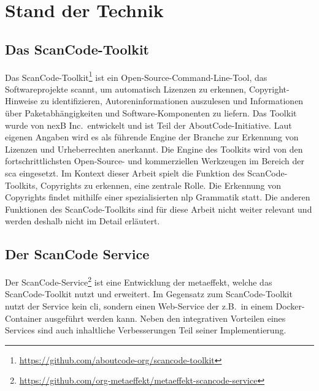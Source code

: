\chapter{Stand der Technik}\label{ch:stand-der-technik}



\section{Das ScanCode-Toolkit}\label{sec:scancode-toolkit}

Das ScanCode-Toolkit\footnote{\url{https://github.com/aboutcode-org/scancode-toolkit}} ist ein Open-Source-Command-Line-Tool, das Softwareprojekte scannt, um automatisch Lizenzen zu erkennen, Copyright-Hinweise zu identifizieren, Autoreninformationen auszulesen und Informationen über Paketabhängigkeiten und Software-Komponenten zu liefern.
Das Toolkit wurde von nexB Inc.\ entwickelt und ist Teil der AboutCode-Initiative.
Laut eigenen Angaben wird es als führende Engine der Branche zur Erkennung von Lizenzen und Urheberrechten anerkannt.
Die Engine des Toolkits wird von den fortschrittlichsten Open-Source- und kommerziellen Werkzeugen im Bereich der \gls{sca} eingesetzt.
Im Kontext dieser Arbeit spielt die Funktion des ScanCode-Toolkits, Copyrights zu erkennen, eine zentrale Rolle.
Die Erkennung von Copyrights findet mithilfe einer spezialisierten \gls{nlp} Grammatik statt.
Die anderen Funktionen des ScanCode-Toolkits sind für diese Arbeit nicht weiter relevant und werden deshalb nicht im Detail erläutert\autocite{noauthor_scancode-toolkit-documentation_nodate}.


\section{Der ScanCode Service}\label{sec:scancode-service}

Der ScanCode-Service\footnote{\url{https://github.com/org-metaeffekt/metaeffekt-scancode-service}} ist eine Entwicklung der metaeffekt, welche das ScanCode-Toolkit nutzt und erweitert.
Im Gegensatz zum ScanCode-Toolkit nutzt der Service kein \gls{cli}, sondern einen Web-Service der z.B.\ in einem Docker-Container ausgeführt werden kann.
Neben den integrativen Vorteilen eines Services sind auch inhaltliche Verbesserungen Teil seiner Implementierung.

